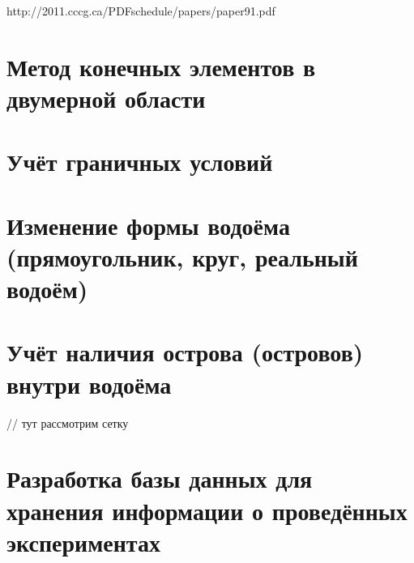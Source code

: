 \documentclass[14pt]{extreport}
\begin{document}
http://2011.cccg.ca/PDFschedule/papers/paper91.pdf





\chapter{Метод конечных элементов в двумерной области}









\chapter{Учёт граничных условий}
\chapter{Изменение формы водоёма (прямоугольник, круг, реальный водоём)}
\chapter{Учёт наличия острова (островов) внутри водоёма}

// тут рассмотрим сетку


\chapter{Разработка базы данных для хранения информации о проведённых экспериментах}




\end{document}
